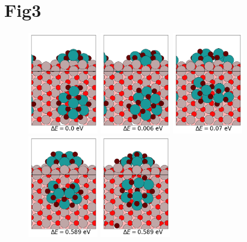 \documentclass{article}
\begin{document}
\section{Fig3}
\begin{figure}[htp]
\begin{center}
\subfigure
{
  \includegraphics[width=1.2in]{Pt7O10_Al2O3_Lowlying_DFTrelxed_0.png}
}
\subfigure
{
  \includegraphics[width=1.2in]{Pt7O10_Al2O3_Lowlying_DFTrelxed_1.png}
}
\subfigure
{
  \includegraphics[width=1.2in]{Pt7O10_Al2O3_Lowlying_DFTrelxed_2.png}
}
\subfigure
{
  \includegraphics[width=1.2in]{Pt7O10_Al2O3_Lowlying_DFTrelxed_4.png}
}
\subfigure
{
  \includegraphics[width=1.2in]{Pt7O10_Al2O3_Lowlying_DFTrelxed_5.png}
}
\end{center}
\end{figure}
\end{document}
